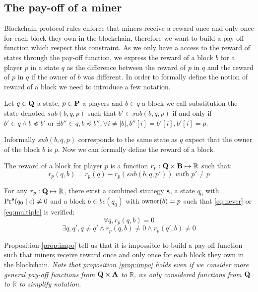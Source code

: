 \subsection{The pay-off of a miner}
Blockchain protocol rules enforce that miners receive a reward once and only once for each block they own
in the blockchain, therefore we want to build a pay-off function which respect this constraint. As we only have a access to the reward of states through the pay-off function, we express the reward of a block $b$ for a player $p$ in a state $q$ as the difference between the reward of $p$ in $q$ and the reward of $p$ in $q$ if the owner of $b$ was different.
In order to formally define the notion of reward of a block we need to introduce a few notation. 
\begin{mydef}
Let $q \in \mathbf{Q}$ a state, $p \in \mathbf{P}$ a players and $b \in q$ a block we call substitution the state denoted $sub(b,q,p)$ such that $b' \in sub(b,q,p)$ if and only if $b' \in q \land b \not \preceq b'$ or $\exists b'' \in q, b \preceq b'', \forall i \neq |b|, b''[i] = b'[i], b'[i] = p$.
\end{mydef}
Informally $sub(b,q,p)$ corresponds to the same state as $q$ expect that the owner of the block $b$ is $p$.
Now we can formally define the reward of a block.
\begin{mydef}
The reward of a block for player $p$ is a function $r_p : \mathbf{Q}  \times \text{\bf B} \mapsto \mathbb{R}$ such that:
\begin{equation*}
r_p(q,b) = r_p(q) - r_p(sub(b,q,p')) \textit{ with } p' \neq p
\end{equation*}
\end{mydef}


\begin{myprop}\label{prop:impo}
For any $r_p: \mathbf{Q}  \mapsto \mathbb{R}$, there exist a combined strategy $\mathbf{s}$, a state $q_0$ with $\Pr^{\mathbf{s}}(q_0 \mid \epsilon) \neq 0$ and a block $b \in bc(q_0)$ with $\text{\rm owner}(b)=p$ such that \ref{eq:never} or \ref{eq:multiple} is verified:
\begin{equation}\label{eq:never}
\forall q, r_p(q,b) = 0
\end{equation}
\begin{equation}\label{eq:multiple}
\exists q,q', q\neq q' \land r_p(q,b) \neq 0 \land r_p(q',b) \neq 0
\end{equation}
\end{myprop}

Proposition \ref{prop:impo} tell us that it is impossible to build a pay-off function such that miners receive reward once and only once for each block they own in the blockchain. \textit{Note that proposition \ref{prop:impo} holds even if we consider more general pay-off functions from $\mathbf{Q} \times \mathbf{A}$ to $\mathbb{R}$, we only considered functions from $\mathbf{Q}$ to $\mathbb{R}$ to simplify notation.}

